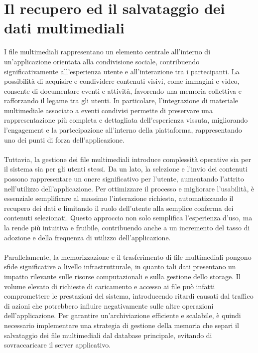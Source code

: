 \chapter{Il recupero ed il salvataggio dei dati multimediali}

I file multimediali rappresentano un elemento centrale 
all’interno di un’applicazione orientata alla condivisione sociale,
contribuendo significativamente all’esperienza utente e all’interazione tra i partecipanti.
La possibilità di acquisire e condividere contenuti visivi, come immagini e video, 
consente di documentare eventi e attività,
favorendo una memoria collettiva e rafforzando il legame tra gli utenti.
In particolare, l’integrazione di materiale multimediale associato a eventi condivisi 
permette di preservare una rappresentazione più completa e dettagliata dell’esperienza vissuta,
migliorando l’engagement e la partecipazione all’interno della piattaforma, 
rappresentando uno dei punti di forza dell’applicazione.\\
\\
Tuttavia, la gestione dei file multimediali introduce complessità operative 
sia per il sistema sia per gli utenti stessi.
Da un lato, la selezione e l’invio dei contenuti 
possono rappresentare un onere significativo per l’utente, 
aumentando l’attrito nell’utilizzo dell’applicazione.
Per ottimizzare il processo e migliorare l’usabilità, 
è essenziale semplificare al massimo l’interazione richiesta,
automatizzando il recupero dei dati e limitando il ruolo dell’utente 
alla semplice conferma dei contenuti selezionati.
Questo approccio non solo semplifica l’esperienza d’uso, 
ma la rende più intuitiva e fruibile,
contribuendo anche a un incremento del tasso di adozione e della frequenza di utilizzo dell’applicazione.\\
\\
Parallelamente, la memorizzazione e il trasferimento di file multimediali 
pongono sfide significative a livello infrastrutturale,
in quanto tali dati presentano un impatto rilevante 
sulle risorse computazionali e sulla gestione dello storage.
Il volume elevato di richieste di caricamento e accesso ai file 
può infatti compromettere le prestazioni del sistema,
introducendo ritardi causati dal traffico di azioni 
che potrebbero influire negativamente sulle altre operazioni dell’applicazione.
Per garantire un’archiviazione efficiente e scalabile, 
è quindi necessario implementare una strategia di gestione della memoria
che separi il salvataggio dei file multimediali dal database principale, 
evitando di sovraccaricare il server applicativo.
